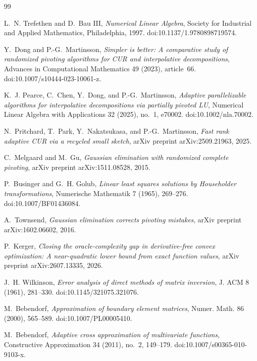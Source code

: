 \documentclass[11pt]{article}
\theoremstyle{definition}
\theoremstyle{remark}
\begin{document}
% 
\begin{thebibliography}{99}

L.~N. Trefethen and D.~Bau III,
\emph{Numerical Linear Algebra},
Society for Industrial and Applied Mathematics, Philadelphia, 1997.
doi:10.1137/1.9780898719574.

Y.~Dong and P.-G.~Martinsson,
\emph{Simpler is better: A comparative study of randomized pivoting
algorithms for CUR and interpolative decompositions},
Advances in Computational Mathematics 49 (2023), article~66.
doi:10.1007/s10444-023-10061-z.

K.~J. Pearce, C.~Chen, Y.~Dong, and P.-G.~Martinsson,
\emph{Adaptive parallelizable algorithms for interpolative decompositions
via partially pivoted LU},
Numerical Linear Algebra with Applications 32 (2025), no.~1, e70002.
doi:10.1002/nla.70002.

N.~Pritchard, T.~Park, Y.~Nakatsukasa, and P.-G.~Martinsson,
\emph{Fast rank adaptive CUR via a recycled small sketch},
arXiv preprint arXiv:2509.21963, 2025.

C.~Melgaard and M.~Gu,
\emph{Gaussian elimination with randomized complete pivoting},
arXiv preprint arXiv:1511.08528, 2015.

P.~Businger and G.~H. Golub,
\emph{Linear least squares solutions by Householder transformations},
Numerische Mathematik 7 (1965), 269--276.
doi:10.1007/BF01436084.

A.~Townsend,
\emph{Gaussian elimination corrects pivoting mistakes},
arXiv preprint arXiv:1602.06602, 2016.

P.~Kerger,
\emph{Closing the oracle-complexity gap in derivative-free convex
optimization: A near-quadratic lower bound from exact function values},
arXiv preprint arXiv:2607.13335, 2026.

J.~H. Wilkinson,
\emph{Error analysis of direct methods of matrix inversion},
J. ACM 8 (1961), 281--330.
doi:10.1145/321075.321076.

M.~Bebendorf,
\emph{Approximation of boundary element matrices},
Numer. Math. 86 (2000), 565--589.
doi:10.1007/PL00005410.

M.~Bebendorf,
\emph{Adaptive cross approximation of multivariate functions},
Constructive Approximation 34 (2011), no.~2, 149--179.
doi:10.1007/s00365-010-9103-x.


\end{thebibliography}
\end{document}
